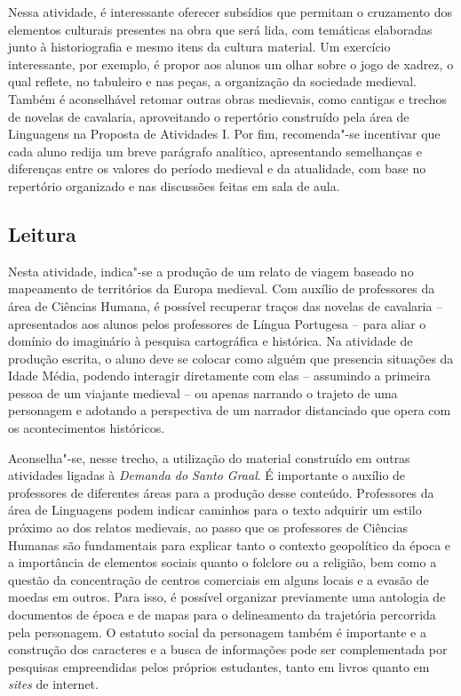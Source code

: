 \documentclass{extarticle}
\begin{document}
Nessa atividade, é interessante oferecer subsídios que permitam o
cruzamento dos elementos culturais presentes na obra que será lida, com
temáticas elaboradas junto à historiografia e mesmo itens da cultura
material. Um exercício interessante, por exemplo, é propor aos alunos um
olhar sobre o jogo de xadrez, o qual reflete, no tabuleiro e nas peças,
a organização da sociedade medieval. Também é aconselhável retomar
outras obras medievais, como cantigas e trechos de novelas de cavalaria,
aproveitando o repertório construído pela área de Linguagens na Proposta
de Atividades I. Por fim, recomenda"-se incentivar que cada aluno redija
um breve parágrafo analítico, apresentando semelhanças e diferenças
entre os valores do período medieval e da atualidade, com base no
repertório organizado e nas discussões feitas em sala de aula.


\subsection{Leitura}

Nesta atividade, indica"-se a produção de um relato de viagem
baseado no mapeamento de territórios da Europa medieval. Com auxílio de
professores da área de Ciências Humana, é possível recuperar traços das
novelas de cavalaria -- apresentados aos alunos pelos professores de
Língua Portugesa -- para aliar o domínio do imaginário à pesquisa
cartográfica e histórica. Na atividade de produção escrita, o aluno deve
se colocar como alguém que presencia situações da Idade Média, podendo
interagir diretamente com elas -- assumindo a primeira pessoa de um
viajante medieval -- ou apenas narrando o trajeto de uma personagem e
adotando a perspectiva de um narrador distanciado que opera com os
acontecimentos históricos.

Aconselha"-se, nesse trecho, a utilização do material construído em
outras atividades ligadas à \emph{Demanda do Santo Graal}. É importante
o auxílio de professores de diferentes áreas para a produção desse
conteúdo. Professores da área de Linguagens podem indicar caminhos para
o texto adquirir um estilo próximo ao dos relatos medievais, ao passo
que os professores de Ciências Humanas são fundamentais para explicar
tanto o contexto geopolítico da época e a importância de elementos
sociais quanto o folclore ou a religião, bem como a questão da
concentração de centros comerciais em alguns locais e a evasão de moedas
em outros. Para isso, é possível organizar previamente uma antologia de
documentos de época e de mapas para o delineamento da trajetória
percorrida pela personagem. O estatuto social da personagem também é
importante e a construção dos caracteres e a busca de informações pode
ser complementada por pesquisas empreendidas pelos próprios estudantes,
tanto em livros quanto em \emph{sites} de internet.
\end{document}
